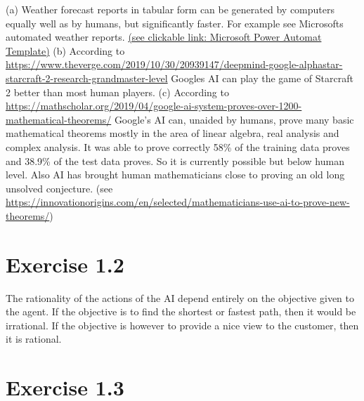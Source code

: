 \documentclass[12pt]{article}
\begin{document}
(a) Weather forecast reports in tabular form can be generated by computers equally well as by humans, but significantly faster. For example see Microsofts automated weather reports.
\href{https://powerautomate.microsoft.com/en-us/templates/details/42ed4470014011e79ad6899240afe964/get-daily-weather-reports-delivered-to-your-email-and-phone/}{(see clickable link: Microsoft Power Automat Template)}
\newline \newline
(b) According to \href{https://www.theverge.com/2019/10/30/20939147/deepmind-google-alphastar-starcraft-2-research-grandmaster-level}{https://www.theverge.com/2019/10/30/20939147/deepmind-google-alphastar-starcraft-2-research-grandmaster-level} Googles AI can play the game of Starcraft 2 better than most human players.
\newline \newline
(c) According to \href{https://mathscholar.org/2019/04/google-ai-system-proves-over-1200-mathematical-theorems/}{https://mathscholar.org/2019/04/google-ai-system-proves-over-1200-mathematical-theorems/} Google's AI can, unaided by humans, prove many basic mathematical theorems mostly in the area of linear algebra, real analysis and complex analysis. It was able to prove correctly 58\% of the training data proves and 38.9\% of the test data proves. So it is currently possible but below human level. Also AI has brought human mathematicians close to proving an old long unsolved conjecture.\newline
(see \href{https://innovationorigins.com/en/selected/mathematicians-use-ai-to-prove-new-theorems/}{https://innovationorigins.com/en/selected/mathematicians-use-ai-to-prove-new-theorems/})

\section*{Exercise 1.2}

The rationality of the actions of the AI depend entirely on the objective given to the agent. If the objective is to find the shortest or fastest path, then it would be irrational. If the objective is however to provide a nice view to the customer, then it is rational.

\section*{Exercise 1.3}
\end{document}
